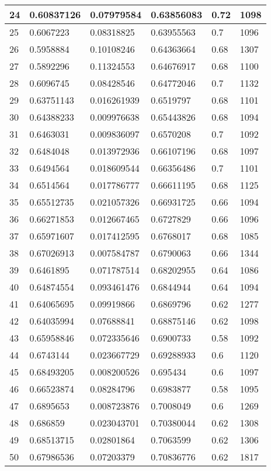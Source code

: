 \begin{longtable}{|l|l|l|l|l|l|}
24 & 0.60837126 & 0.07979584 & 0.63856083 & 0.72 & 1098 \\ \hline 
25 & 0.6067223 & 0.08318825 & 0.63955563 & 0.7 & 1096 \\ \hline 
26 & 0.5958884 & 0.10108246 & 0.64363664 & 0.68 & 1307 \\ \hline 
27 & 0.5892296 & 0.11324553 & 0.64676917 & 0.68 & 1100 \\ \hline 
28 & 0.6096745 & 0.08428546 & 0.64772046 & 0.7 & 1132 \\ \hline 
29 & 0.63751143 & 0.016261939 & 0.6519797 & 0.68 & 1101 \\ \hline 
30 & 0.64388233 & 0.009976638 & 0.65443826 & 0.68 & 1094 \\ \hline 
31 & 0.6463031 & 0.009836097 & 0.6570208 & 0.7 & 1092 \\ \hline 
32 & 0.6484048 & 0.013972936 & 0.66107196 & 0.68 & 1097 \\ \hline 
33 & 0.6494564 & 0.018609544 & 0.66356486 & 0.7 & 1101 \\ \hline 
34 & 0.6514564 & 0.017786777 & 0.66611195 & 0.68 & 1125 \\ \hline 
35 & 0.65512735 & 0.021057326 & 0.66931725 & 0.66 & 1094 \\ \hline 
36 & 0.66271853 & 0.012667465 & 0.6727829 & 0.66 & 1096 \\ \hline 
37 & 0.65971607 & 0.017412595 & 0.6768017 & 0.68 & 1085 \\ \hline 
38 & 0.67026913 & 0.007584787 & 0.6790063 & 0.66 & 1344 \\ \hline 
39 & 0.6461895 & 0.071787514 & 0.68202955 & 0.64 & 1086 \\ \hline 
40 & 0.64874554 & 0.093461476 & 0.6844944 & 0.64 & 1094 \\ \hline 
41 & 0.64065695 & 0.09919866 & 0.6869796 & 0.62 & 1277 \\ \hline 
42 & 0.64035994 & 0.07688841 & 0.68875146 & 0.62 & 1098 \\ \hline 
43 & 0.65958846 & 0.072335646 & 0.6900733 & 0.58 & 1092 \\ \hline 
44 & 0.6743144 & 0.023667729 & 0.69288933 & 0.6 & 1120 \\ \hline 
45 & 0.68493205 & 0.008200526 & 0.695434 & 0.6 & 1097 \\ \hline 
46 & 0.66523874 & 0.08284796 & 0.6983877 & 0.58 & 1095 \\ \hline 
47 & 0.6895653 & 0.008723876 & 0.7008049 & 0.6 & 1269 \\ \hline 
48 & 0.686859 & 0.023043701 & 0.70380044 & 0.62 & 1308 \\ \hline 
49 & 0.68513715 & 0.02801864 & 0.7063599 & 0.62 & 1306 \\ \hline 
50 & 0.67986536 & 0.07203379 & 0.70836776 & 0.62 & 1817 \\ \hline 
\end{longtable}